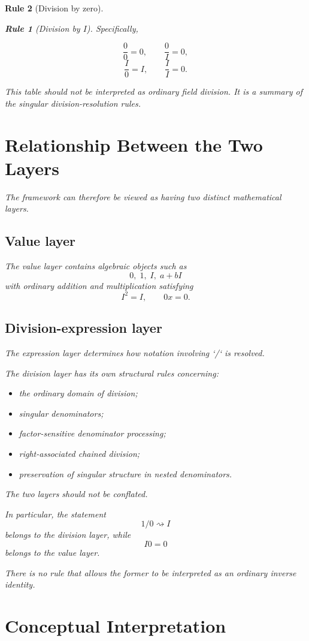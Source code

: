 \documentclass[11pt,a4paper]{article}
\newtheorem{rulethm}{Rule}[section]
\begin{document}
\begin{rulethm}[Division by zero]
\begin{rulethm}[Division by $I$]
Specifically,

\[
\frac00=0,
\qquad
\frac0I=0,
\]
\[
\frac I0=I,
\qquad
\frac II=0.
\]

This table should not be interpreted as ordinary field division. It is a
summary of the singular division-resolution rules.

\section{Relationship Between the Two Layers}

The framework can therefore be viewed as having two distinct mathematical
layers.

\subsection{Value layer}

The value layer contains algebraic objects such as
\[
0,\;1,\;I,\;a+bI
\]
with ordinary addition and multiplication satisfying
\[
I^2=I,
\qquad
0x=0.
\]

\subsection{Division-expression layer}

The expression layer determines how notation involving `/` is resolved.

The division layer has its own structural rules concerning:

\begin{itemize}
    \item the ordinary domain of division;
    \item singular denominators;
    \item factor-sensitive denominator processing;
    \item right-associated chained division;
    \item preservation of singular structure in nested denominators.
\end{itemize}

The two layers should not be conflated.

In particular, the statement
\[
1/0\rightsquigarrow I
\]
belongs to the division layer, while
\[
I0=0
\]
belongs to the value layer.

There is no rule that allows the former to be interpreted as an ordinary
inverse identity.

\section{Conceptual Interpretation}


\end{rulethm}
\end{rulethm}
\end{document}
